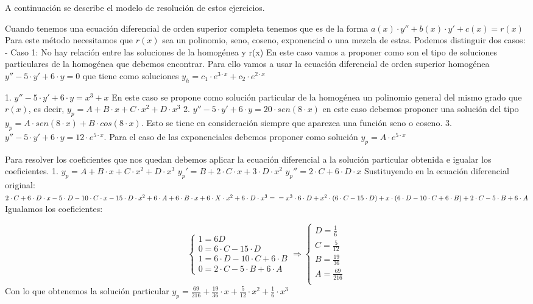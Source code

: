 \begin{ejer}
	A continuación se describe el modelo de resolución de estos ejercicios.
\end{ejer}
\begin{sol}
	Cuando tenemos una ecuación diferencial de orden superior completa tenemos que es de la forma $a(x)\cdot y'' + b(x)\cdot y' + c(x) = r(x)$  
	Para este método necesitamos que $r(x)$ sea un polinomio, seno, coseno, exponencial o una mezcla de estas. Podemos distinguir dos casos:  
	- Caso 1: No hay relación entre las soluciones de la homogénea y r(x)  
	En este caso vamos a proponer como son el tipo de soluciones particulares de la homogénea que debemos encontrar. Para ello vamos a usar la ecuación diferencial de orden superior homogénea $y'' - 5\cdot y' + 6\cdot y = 0$ que tiene como soluciones $y_h = c_1\cdot e^{3\cdot x} + c_2\cdot e^{2\cdot x}$  
	
	1. $y''-5\cdot y'+6\cdot y = x^3 + x$  
	En este caso se propone como solución particular de la homogénea un polinomio general del mismo grado que $r(x)$, es decir, $y_p = A+B\cdot x + C\cdot x^2 + D\cdot x^3$  
	2. $y''-5\cdot y' + 6\cdot y = 20\cdot sen(8\cdot x)$ en este caso debemos proponer una solución del tipo $y_p = A\cdot sen(8\cdot x) + B\cdot cos(8\cdot x)$. Esto se tiene en consideración siempre que aparezca una función seno o coseno.
	3. $y''-5\cdot y' + 6\cdot y = 12\cdot e^{5\cdot x}$. Para el caso de las exponenciales debemos proponer como solución $y_p = A\cdot e^{5\cdot x}$   
	
	Para resolver los coeficientes que nos quedan debemos aplicar la ecuación diferencial a la solución particular obtenida e igualar los coeficientes.
	1. $y_p = A+B\cdot x + C\cdot x^2 + D\cdot x^3$  
	$y_p' = B+2\cdot C\cdot x + 3\cdot D\cdot x^2$  
	$y_p'' = 2\cdot C + 6\cdot D\cdot x$  
	Sustituyendo en la ecuación diferencial original:  
	$2\cdot C + 6\cdot D\cdot x - 5\cdot D - 10\cdot C\cdot x - 15\cdot D\cdot x^2 + 6\cdot A + 6\cdot B\cdot x + 6\cdot X\cdot x^2 + 6\cdot D\cdot x^3 =\\= x^3\cdot 6\cdot D + x^2\cdot (6\cdot C - 15\cdot D) + x\cdot (6\cdot D - 10\cdot C + 6\cdot B) + 2\cdot C - 5\cdot B + 6\cdot A$  
	Igualamos los coeficientes:  
	
	$$
	\begin{cases}
	1 = 6D \\
	0 = 6\cdot C-15\cdot D \\
	1 = 6\cdot D - 10\cdot C + 6\cdot B \\
	0 = 2\cdot C - 5\cdot B + 6\cdot A
	\end{cases}
	\Rightarrow
	\begin{cases}
	D = \frac{1}{6} \\
	C = \frac{5}{12} \\
	B = \frac{19}{36} \\
	A = \frac{69}{216} \\
	\end{cases}
	$$
	Con lo que obtenemos la solución particular $y_p = \frac{69}{216} + \frac{19}{36}\cdot x + \frac{5}{12}\cdot x^2 + \frac{1}{6}\cdot x^3$  
	

\end{sol}
